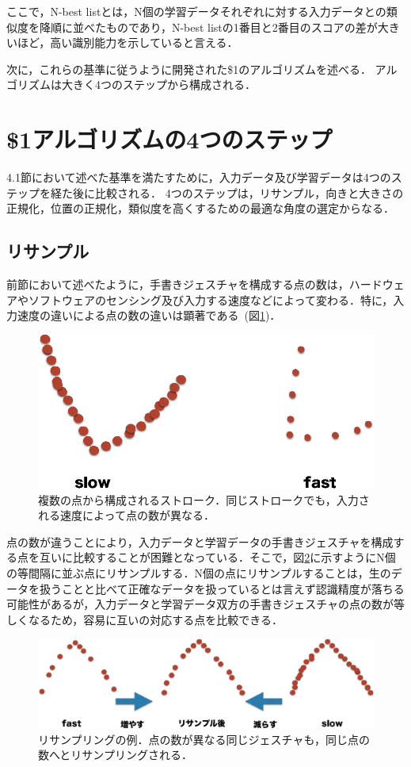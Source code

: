 ここで，N-best listとは，N個の学習データそれぞれに対する入力データとの類似度を降順に並べたものであり，N-best listの1番目と2番目のスコアの差が大きいほど，高い識別能力を示していると言える．

次に，これらの基準に従うように開発された\$1のアルゴリズムを述べる．
アルゴリズムは大きく4つのステップから構成される．


\section{\$1アルゴリズムの4つのステップ}
4.1節において述べた基準を満たすために，入力データ及び学習データは4つのステップを経た後に比較される．
4つのステップは，リサンプル，向きと大きさの正規化，位置の正規化，類似度を高くするための最適な角度の選定からなる．

\subsection{リサンプル}
前節において述べたように，手書きジェスチャを構成する点の数は，ハードウェアやソフトウェアのセンシング及び入力する速度などによって変わる．特に，入力速度の違いによる点の数の違いは顕著である~(図\ref{fig:strokes})．

\begin{figure} [!h]
\centering
\includegraphics [width=0.8\columnwidth]{img/strokes.eps}
\caption{複数の点から構成されるストローク．同じストロークでも，入力される速度によって点の数が異なる．}
\label{fig:strokes}
\end{figure}

点の数が違うことにより，入力データと学習データの手書きジェスチャを構成する点を互いに比較することが困難となっている．そこで，図\ref{fig:resample}に示すようにN個の等間隔に並ぶ点にリサンプルする．N個の点にリサンプルすることは，生のデータを扱うことと比べて正確なデータを扱っているとは言えず認識精度が落ちる可能性があるが，入力データと学習データ双方の手書きジェスチャの点の数が等しくなるため，容易に互いの対応する点を比較できる．

\begin{figure} [!h]
\centering
\includegraphics [width=0.8\columnwidth]{img/resample.eps}
\caption{リサンプリングの例．点の数が異なる同じジェスチャも，同じ点の数へとリサンプリングされる．}
\label{fig:resample}
\end{figure}

